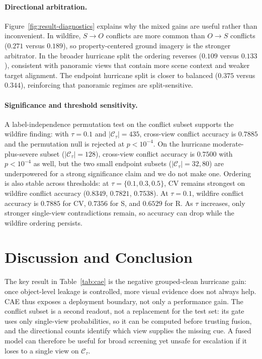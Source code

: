 \documentclass[sigconf]{acmart}
\newcommand{\conf}{\mathcal{C}_{\tau}}
\begin{document}
\paragraph{Directional arbitration.}
Figure~\ref{fig:result-diagnostics} explains why the mixed gains are useful
rather than inconvenient. In wildfire, $S{\rightarrow}O$ conflicts are more
common than $O{\rightarrow}S$ conflicts ($0.271$ versus $0.189$), so
property-centered ground imagery is the stronger arbitrator. In the broader
hurricane split the ordering reverses ($0.109$ versus $0.133$), consistent with
panoramic views that contain more scene context and weaker target alignment. The
endpoint hurricane split is closer to balanced ($0.375$ versus $0.344$),
reinforcing that panoramic regimes are split-sensitive.

\paragraph{Significance and threshold sensitivity.}
A label-independence permutation test on the conflict subset supports the
wildfire finding: with $\tau=0.1$ and $|\conf|=435$, cross-view conflict
accuracy is $0.7885$ and the permutation null is rejected at $p<10^{-4}$. On the
hurricane moderate-plus-severe subset ($|\conf|=128$), cross-view conflict
accuracy is $0.7500$ with $p<10^{-4}$ as well, but the two small endpoint
subsets ($|\conf|=32,80$) are underpowered for a strong significance claim and
we do not make one. Ordering is also stable across thresholds: at
$\tau=\{0.1,0.3,0.5\}$, CV remains strongest on wildfire conflict accuracy
($0.8349$, $0.7821$, $0.7538$). At $\tau=0.1$, wildfire conflict accuracy is
$0.7885$ for CV, $0.7356$ for S, and $0.6529$ for R. As $\tau$ increases, only
stronger single-view contradictions remain, so accuracy can drop while the
wildfire ordering persists.

\section{Discussion and Conclusion}

The key result in Table~\ref{tab:cae} is the negative grouped-clean hurricane
gain: once object-level leakage is controlled, more visual evidence does not
always help. CAE thus exposes a deployment boundary, not only a performance
gain. The conflict subset is a second readout, not a replacement for the test
set: its gate uses only single-view probabilities, so it can be computed before
trusting fusion, and the directional counts identify which view supplies the
missing cue. A fused model can therefore be useful for broad screening yet
unsafe for escalation if it loses to a single view on $\conf$.
\end{document}
